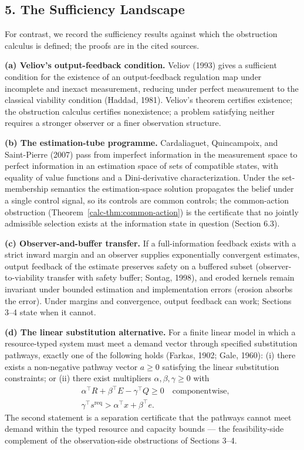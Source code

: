 \documentclass[10pt,twocolumn]{article}
\theoremstyle{definition}
\begin{document}
\subsection{5. The Sufficiency Landscape}\label{calc-the-sufficiency-landscape-cited}

For contrast, we record the sufficiency results against which the obstruction calculus is defined; the proofs are in the cited sources.

\textbf{(a) Veliov's output-feedback condition.} Veliov (1993) gives a sufficient condition for the existence of an output-feedback regulation map under incomplete and inexact measurement, reducing under perfect measurement to the classical viability condition (Haddad, 1981). Veliov's theorem certifies existence; the obstruction calculus certifies nonexistence; a problem satisfying neither requires a stronger observer or a finer observation structure.

\textbf{(b) The estimation-tube programme.} Cardaliaguet, Quincampoix, and Saint-Pierre (2007) pass from imperfect information in the measurement space to perfect information in an estimation space of sets of compatible states, with equality of value functions and a Dini-derivative characterization. Under the set-membership semantics the estimation-space solution propagates the belief under a single control signal, so its controls are common controls; the common-action obstruction (Theorem~\ref{calc-thm:common-action}) is the certificate that no jointly admissible selection exists at the information state in question (Section 6.3).

\textbf{(c) Observer-and-buffer transfer.} If a full-information feedback exists with a strict inward margin and an observer supplies exponentially convergent estimates, output feedback of the estimate preserves safety on a buffered subset (observer-to-viability transfer with safety buffer; Sontag, 1998), and eroded kernels remain invariant under bounded estimation and implementation errors (erosion absorbs the error). Under margins and convergence, output feedback can work; Sections 3--4 state when it cannot.

\textbf{(d) The linear substitution alternative.} For a finite linear model in which a resource-typed system must meet a demand vector through specified substitution pathways, exactly one of the following holds (Farkas, 1902; Gale, 1960): (i) there exists a non-negative pathway vector \(a \ge 0\) satisfying the linear substitution constraints; or (ii) there exist multipliers \(\alpha, \beta, \gamma \ge 0\) with
\[
\begin{aligned}
&\alpha^\top R + \beta^\top E - \gamma^\top Q \ge 0 \quad\text{componentwise},\\
&\gamma^\top s^{\mathrm{req}} > \alpha^\top x + \beta^\top e.
\end{aligned}
\]
The second statement is a separation certificate that the pathways cannot meet demand within the typed resource and capacity bounds --- the feasibility-side complement of the observation-side obstructions of Sections 3--4.
\end{document}
